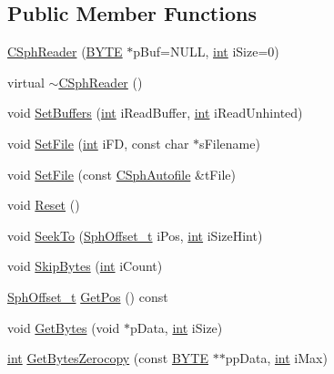 \subsection*{Public Member Functions}
\begin{DoxyCompactItemize}
\item 
\hyperlink{classCSphReader_a70b69bde8fc66ccabee29984e58eabfa}{C\-Sph\-Reader} (\hyperlink{sphinxstd_8h_a4ae1dab0fb4b072a66584546209e7d58}{B\-Y\-T\-E} $\ast$p\-Buf=N\-U\-L\-L, \hyperlink{sphinxexpr_8cpp_a4a26e8f9cb8b736e0c4cbf4d16de985e}{int} i\-Size=0)
\item 
virtual \hyperlink{classCSphReader_a7ca05a00a302e373a032bc34b7a309bf}{$\sim$\-C\-Sph\-Reader} ()
\item 
void \hyperlink{classCSphReader_a5d3cfa977131135d07cfa0b000aaf9a3}{Set\-Buffers} (\hyperlink{sphinxexpr_8cpp_a4a26e8f9cb8b736e0c4cbf4d16de985e}{int} i\-Read\-Buffer, \hyperlink{sphinxexpr_8cpp_a4a26e8f9cb8b736e0c4cbf4d16de985e}{int} i\-Read\-Unhinted)
\item 
void \hyperlink{classCSphReader_aeddf7f4e6bcd5e0e6a21b28bc299f77c}{Set\-File} (\hyperlink{sphinxexpr_8cpp_a4a26e8f9cb8b736e0c4cbf4d16de985e}{int} i\-F\-D, const char $\ast$s\-Filename)
\item 
void \hyperlink{classCSphReader_ac87a589faba14c2b3f1c1ba3f3c74d01}{Set\-File} (const \hyperlink{classCSphAutofile}{C\-Sph\-Autofile} \&t\-File)
\item 
void \hyperlink{classCSphReader_acaf2cda7211043eee64f82095272e5d0}{Reset} ()
\item 
void \hyperlink{classCSphReader_ad0d79b8d40e31bfce72cbe13cbf9979b}{Seek\-To} (\hyperlink{sphinx_8h_a0fb3b64afebef33c61367714754eaa90}{Sph\-Offset\-\_\-t} i\-Pos, \hyperlink{sphinxexpr_8cpp_a4a26e8f9cb8b736e0c4cbf4d16de985e}{int} i\-Size\-Hint)
\item 
void \hyperlink{classCSphReader_ae5d07112f2091c3a6e05c2f5a00118fa}{Skip\-Bytes} (\hyperlink{sphinxexpr_8cpp_a4a26e8f9cb8b736e0c4cbf4d16de985e}{int} i\-Count)
\item 
\hyperlink{sphinx_8h_a0fb3b64afebef33c61367714754eaa90}{Sph\-Offset\-\_\-t} \hyperlink{classCSphReader_a262675e18a0629250d6732ba39212805}{Get\-Pos} () const 
\item 
void \hyperlink{classCSphReader_ad5799ce9882bdf0ab9df21a1e65a6fe0}{Get\-Bytes} (void $\ast$p\-Data, \hyperlink{sphinxexpr_8cpp_a4a26e8f9cb8b736e0c4cbf4d16de985e}{int} i\-Size)
\item 
\hyperlink{sphinxexpr_8cpp_a4a26e8f9cb8b736e0c4cbf4d16de985e}{int} \hyperlink{classCSphReader_a05907d3be7faa2432ed22d8dd90186c0}{Get\-Bytes\-Zerocopy} (const \hyperlink{sphinxstd_8h_a4ae1dab0fb4b072a66584546209e7d58}{B\-Y\-T\-E} $\ast$$\ast$pp\-Data, \hyperlink{sphinxexpr_8cpp_a4a26e8f9cb8b736e0c4cbf4d16de985e}{int} i\-Max)
$$
\end{DoxyCompactItemize}
